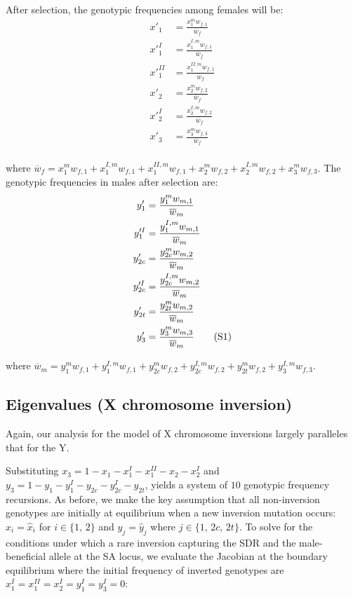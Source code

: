 \documentclass[11pt]{article}
\newcommand\numberthis{\addtocounter{equation}{1}\tag{\theequation}}
\begin{document}
\noindent After selection, the genotypic frequencies among females will be:
\begin{align*}
	x'_{1}     &= \frac{x^m_1 w_{f,1}     }{\overline{w}_{f}} \\
	x'^{I}_{1}  &= \frac{x^{I,m}_1 w_{f,1} }{\overline{w}_{f}} \\
	x'^{II}_{1} &= \frac{x^{II,m}_1 w_{f,1}}{\overline{w}_{f}} \\
	x'_{2}      &= \frac{x^m_2 w_{f,2}     }{\overline{w}_{f}} \\
	x'^{I}_{2}  &= \frac{x^{I,m}_2 w_{f,2} }{\overline{w}_{f}} \\
	x'_{3}      &= \frac{x^m_3 w_{f,3}     }{\overline{w}_{f}} \\
\end{align*}
    
\noindent where $\overline{w}_{f} = x^m_1 w_{f,1} + x^{I,m}_1 w_{f,1} + x^{II,m}_1 w_{f,1} + x^m_2 w_{f,2} + x^{I,m}_2 w_{f,2} + x^m_3 w_{f,3} $. The genotypic frequencies in males after selection are:
\begin{align*}
	y'_{1}       &= \frac{y^m_1 w_{m,1}       }{\overline{w}_{m}} \\
	y'^I_{1}     &= \frac{y^{I,m}_{1} w_{m,1} }{\overline{w}_{m}} \\
	y'_{2c}      &= \frac{y^{m}_{2c} w_{m,2}  }{\overline{w}_{m}}  \\
	y'^I_{2c}    &= \frac{y^{I,m}_{2c} w_{m,2}}{\overline{w}_{m}} \\
	y'_{2t}      &= \frac{y^m_{2t} w_{m,2}    }{\overline{w}_{m}} \\
	y'_{3}       &= \frac{y^{m}_3 w_{m,3}   }{\overline{w}_{m}} \numberthis
\end{align*}
  
\noindent where $\overline{w}_{m} = y^m_1 w_{f,1} + y^{I,m}_{1} w_{f,1} + y^{m}_{2c} w_{f,2} + y^{I,m}_{2c} w_{f,2} + y^m_{2t} w_{f,2} + y^{I,m}_3 w_{f,3} $.



\subsection{Eigenvalues (X chromosome inversion)}

Again, our analysis for the model of X chromosome inversions largely paralleles that for the Y.

Substituting $x_3 = 1 - x_{1} - x^I_{1} - x^{II}_{1} - x_{2} - x^I_{2}$ and $y_3 = 1 - y_1 - y^I_1 - y_{2c} - y^I_{2c} - y_{2t}$, yields a system of $10$ genotypic frequency recursions. As before, we make the key assumption that all non-inversion genotypes are initially at equilibrium when a new inversion mutation occurs: $x_i = \hat{x}_i$ for $i \in \{1,\,2 \}$ and $y_j = \hat{y}_j$ where $j \in \{ 1,\,2c,\,2t \}$. To solve for the conditions under which a rare inversion capturing the SDR and the male-beneficial allele at the SA locus, we evaluate the Jacobian at the boundary equilibrium where the initial frequency of inverted genotypes are $x^{I}_{1} = x^{II}_{1} = x^I_2 = y^I_1 = y^I_3 = 0$:
\end{document}
